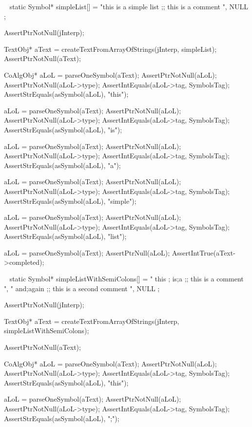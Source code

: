 \CTestsSetup\
\startCTest
static Symbol* simpleList[] = {
  "this is a simple list ;; this is a comment ",
  NULL
};
\stopCTest

\startCTest
  AssertPtrNotNull(jInterp);

  TextObj* aText =
    createTextFromArrayOfStrings(jInterp, simpleList);
  AssertPtrNotNull(aText);

  CoAlgObj* aLoL = parseOneSymbol(aText);
  AssertPtrNotNull(aLoL);
  AssertPtrNotNull(aLoL->type);
  AssertIntEquals(aLoL->tag, SymbolsTag);
  AssertStrEquals(asSymbol(aLoL), "this");

  aLoL = parseOneSymbol(aText);
  AssertPtrNotNull(aLoL);
  AssertPtrNotNull(aLoL->type);
  AssertIntEquals(aLoL->tag, SymbolsTag);
  AssertStrEquals(asSymbol(aLoL), "is");

  aLoL = parseOneSymbol(aText);
  AssertPtrNotNull(aLoL);
  AssertPtrNotNull(aLoL->type);
  AssertIntEquals(aLoL->tag, SymbolsTag);
  AssertStrEquals(asSymbol(aLoL), "a");

  aLoL = parseOneSymbol(aText);
  AssertPtrNotNull(aLoL);
  AssertPtrNotNull(aLoL->type);
  AssertIntEquals(aLoL->tag, SymbolsTag);
  AssertStrEquals(asSymbol(aLoL), "simple");

  aLoL = parseOneSymbol(aText);
  AssertPtrNotNull(aLoL);
  AssertPtrNotNull(aLoL->type);
  AssertIntEquals(aLoL->tag, SymbolsTag);
  AssertStrEquals(asSymbol(aLoL), "list");

  aLoL = parseOneSymbol(aText);
  AssertPtrNull(aLoL);
  AssertIntTrue(aText->completed);
\stopCTest
\stopTestCase

\CTestsSetup\
\startCTest
static Symbol* simpleListWithSemiColons[] = {
  " this ; is;a ;; this is a comment ",
  " and;again ;; this is a second comment ",
  NULL
};
\stopCTest

\startCTest
  AssertPtrNotNull(jInterp);

  TextObj* aText =
    createTextFromArrayOfStrings(jInterp, simpleListWithSemiColons);

  AssertPtrNotNull(aText);

  CoAlgObj* aLoL = parseOneSymbol(aText);
  AssertPtrNotNull(aLoL);
  AssertPtrNotNull(aLoL->type);
  AssertIntEquals(aLoL->tag, SymbolsTag);
  AssertStrEquals(asSymbol(aLoL), "this");

  aLoL = parseOneSymbol(aText);
  AssertPtrNotNull(aLoL);
  AssertPtrNotNull(aLoL->type);
  AssertIntEquals(aLoL->tag, SymbolsTag);
  AssertStrEquals(asSymbol(aLoL), ";");

